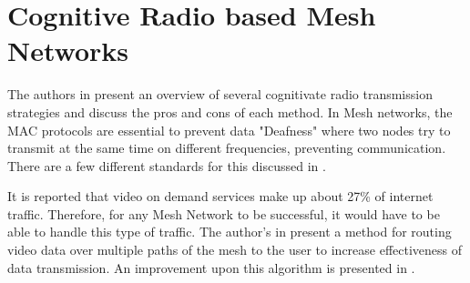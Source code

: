 \section{Cognitive Radio based Mesh Networks}

The authors in \cite{5457862} present an overview of several cognitivate radio transmission strategies and discuss the pros and cons of each method. 
In Mesh networks, the MAC protocols are essential to prevent data "Deafness" where two nodes try to
transmit at the same time on different frequencies, preventing communication. There are a few 
different standards for this discussed in \cite{6392009}.

It is reported that video on demand services make up about 27\% of internet traffic. Therefore,
for any Mesh Network to be successful, it would have to be able to handle this type of traffic. The
author's in \cite{6112757} present a method for routing video data over multiple paths of the mesh
to the user to increase effectiveness of data transmission. An improvement upon this algorithm
is presented in \cite{6778761}. 

